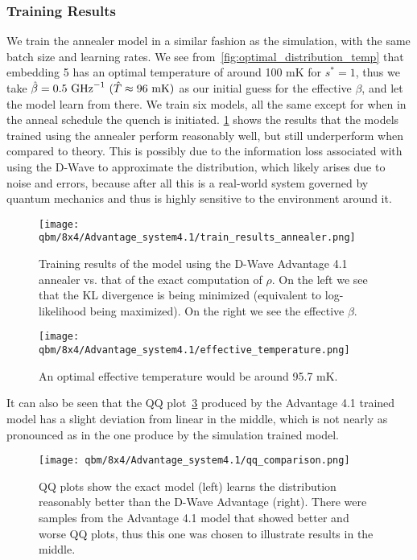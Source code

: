 \subsubsection{Training Results}
We train the annealer model in a similar fashion as the simulation, with the same batch size and learning rates.
We see from~\cref{fig:optimal_distribution_temp} that embedding 5 has an optimal temperature of around 100 \si{\milli\kelvin} for \( s^* = 1 \), thus we take \( \betahat = 0.5 \ \si{\giga\hertz}^{-1} \ (\hat{T} \approx 96 \ \si{\milli\kelvin}) \) as our initial guess for the effective \( \beta \), and let the model learn from there.
We train six models, all the same except for when in the anneal schedule the quench is initiated.
\cref{fig:train_results_annealer} shows the results that the models trained using the annealer perform reasonably well, but still underperform when compared to theory.
This is possibly due to the information loss associated with using the D-Wave to approximate the distribution, which likely arises due to noise and errors, because after all this is a real-world system governed by quantum mechanics and thus is highly sensitive to the environment around it.
\begin{figure}[!htb]
    \begin{center}
        \texttt{[image: qbm/8x4/Advantage\_system4.1/train\_results\_annealer.png]}
    \end{center}
    \caption{Training results of the model using the D-Wave Advantage 4.1 annealer vs. that of the exact computation of \( \rho \). On the left we see that the KL divergence is being minimized (equivalent to log-likelihood being maximized). On the right we see the effective \( \beta \).}
    \label{fig:train_results_annealer}
\end{figure}
\begin{figure}[!htb]
    \begin{center}
        \texttt{[image: qbm/8x4/Advantage\_system4.1/effective\_temperature.png]}
    \end{center}
    \caption{An optimal effective temperature would be around 95.7 \si{\milli\kelvin}.}
    \label{fig:learned_effective_temperature}
\end{figure}

It can also be seen that the QQ plot~\cref{fig:qq_comparison} produced by the Advantage 4.1 trained model has a slight deviation from linear in the middle, which is not nearly as pronounced as in the one produce by the simulation trained model.
\begin{figure}[!htb]
    \begin{center}
        \texttt{[image: qbm/8x4/Advantage\_system4.1/qq\_comparison.png]}
    \end{center}
    \caption{QQ plots show the exact model (left) learns the distribution reasonably better than the D-Wave Advantage (right). There were samples from the Advantage 4.1 model that showed better and worse QQ plots, thus this one was chosen to illustrate results in the middle.}
    \label{fig:qq_comparison}
\end{figure}

